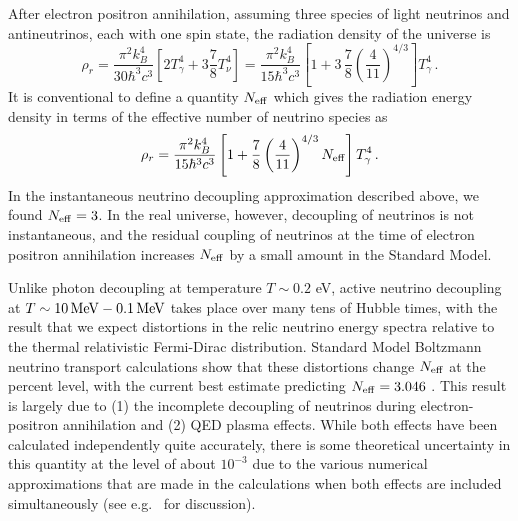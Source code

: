After electron positron annihilation, assuming three species of light neutrinos and antineutrinos, each with one spin state, the radiation density of the universe is
\begin{equation}
	\rho_r = \frac{\pi^2k_B^4}{30\hbar^3 c^3}\left[2T_\gamma^4 + 3\frac{7}{8}T_\nu^4\right] = \frac{\pi^2k_B^4}{15\hbar^3 c^3}\left[1+3\,\frac{7}{8}\left(\frac{4}{11}\right)^{4/3}\right] T_\gamma^4 \, .
\end{equation}
It is conventional to define a quantity $N_{\rm eff}$ which gives the radiation energy density in terms of the effective number of neutrino species as
\begin{equation}
	\rho_r = \frac{\pi^2k_B^4}{15\hbar^3 c^3}\left[1+\frac{7}{8}\left(\frac{4}{11}\right)^{4/3}N_{\rm eff}\right] T_\gamma^4 \, .
\end{equation}
In the instantaneous neutrino decoupling approximation described above, we found $N_{\rm eff} = 3$.  In the real universe, however, decoupling of neutrinos is not instantaneous, and the residual coupling of neutrinos at the time of electron positron annihilation increases $N_{\rm eff}$ by a small amount in the Standard Model.

Unlike photon decoupling at temperature $T \sim 0.2$ eV, active neutrino decoupling at $T \sim 10 \, {\rm MeV} - 0.1 \, {\rm MeV}$ takes place over many tens of Hubble times, with the result that we expect distortions in the relic neutrino energy spectra relative to the thermal relativistic Fermi-Dirac distribution. Standard Model Boltzmann neutrino transport calculations show that these distortions change $N_{\rm eff}$ at the percent level, with the current best estimate predicting $N_{\rm eff} = 3.046$ \cite{Mangano:2005cc}.   This result is largely due to (1) the incomplete decoupling of neutrinos during electron-positron annihilation and (2) QED plasma effects.  While both effects have been calculated independently quite accurately, there is some theoretical uncertainty in this quantity at the level of about $10^{-3}$ due to the various numerical approximations that are made in the calculations when both effects are included simultaneously (see e.g.~\cite{Grohs:2015tfy} for discussion).  



